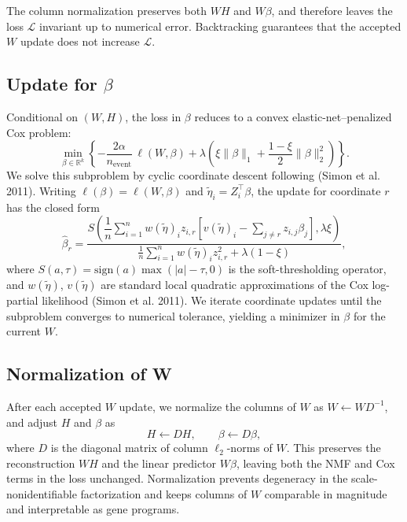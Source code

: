 \documentclass[
]{article}
\begin{document}
The column normalization preserves both \(WH\) and \(W\beta\), and
therefore leaves the loss \(\mathcal{L}\) invariant up to numerical
error. Backtracking guarantees that the accepted \(W\) update does not
increase \(\mathcal{L}\).

\subsection{Update for $\beta$}

Conditional on \((W,H)\), the loss in \(\beta\) reduces to a convex
elastic-net--penalized Cox problem: \[
\min_{\beta \in \mathbb{R}^k}
\left\{
  -\frac{2\alpha}{n_{\mathrm{event}}}\,\ell(W,\beta)
  +
  \lambda\left(
    \xi \lVert \beta \rVert_1
    +\frac{1-\xi}{2} \lVert \beta \rVert_2^2
  \right)
\right\}.
\] We solve this subproblem by cyclic coordinate descent following
(Simon et al. 2011). Writing \(\ell(\beta) = \ell(W,\beta)\) and
\(\tilde{\eta}_i = Z_i^\top \beta\), the update for coordinate \(r\) has
the closed form \begin{equation}
\label{eqn:beta_update}
\hat{\beta}_r
=
\frac{
  S\!\left(
    \dfrac{1}{n}
    \sum_{i=1}^n w(\tilde{\eta})_i
    z_{i,r}
    \left[
      v(\tilde{\eta})_i - \sum_{j \ne r} z_{i,j} \beta_j
    \right],
    \lambda \xi
  \right)
}{
  \frac{1}{n} \sum_{i=1}^n w(\tilde{\eta})_i z_{i,r}^2 + \lambda(1-\xi)
},
\end{equation} where \(S(a,\tau) = \mathrm{sign}(a)\max(|a|-\tau,0)\) is
the soft-thresholding operator, and \(w(\tilde{\eta})\),
\(v(\tilde{\eta})\) are standard local quadratic approximations of the
Cox log-partial likelihood (Simon et al. 2011). We iterate coordinate
updates until the subproblem converges to numerical tolerance, yielding
a minimizer in \(\beta\) for the current \(W\).

\subsection{Normalization of W}

After each accepted \(W\) update, we normalize the columns of \(W\) as
\(W \leftarrow W D^{-1}\), and adjust \(H\) and \(\beta\) as \[
H \leftarrow D H, \qquad \beta \leftarrow D \beta,
\] where \(D\) is the diagonal matrix of column \(\ell_2\)-norms of
\(W\). This preserves the reconstruction \(WH\) and the linear predictor
\(W\beta\), leaving both the NMF and Cox terms in the loss unchanged.
Normalization prevents degeneracy in the scale-nonidentifiable
factorization and keeps columns of \(W\) comparable in magnitude and
interpretable as gene programs.
\end{document}
